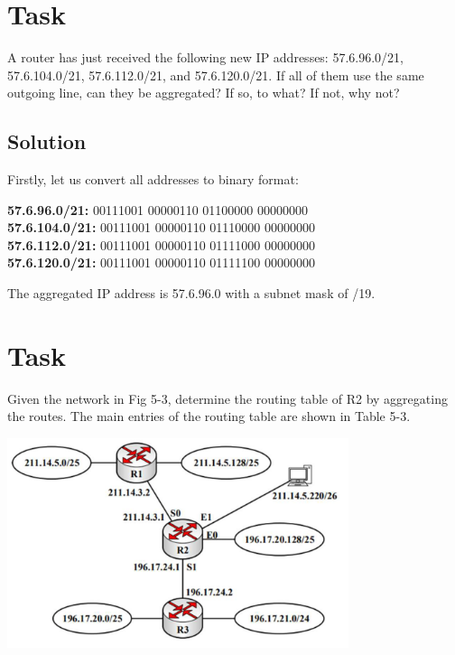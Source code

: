 \documentclass[11pt]{article}
\begin{document}
    \newpage


    \section{Task}
    A router has just received the following new IP addresses: 57.6.96.0/21, 57.6.104.0/21, 57.6.112.0/21,
    and 57.6.120.0/21.
    If all of them use the same outgoing line, can they be aggregated?
    If so, to what?
    If not, why not?

    \subsection{Solution}
    Firstly, let us convert all addresses to binary format:

    \begin{center}
        \textbf{57.6.96.0/21:} 00111001 \hspace{3} 00000110 \hspace{3}01100000 \hspace{3}00000000 \\
        \textbf{57.6.104.0/21:} 00111001 \hspace{3} 00000110 \hspace{3}01110000 \hspace{3}00000000 \\
        \textbf{57.6.112.0/21:} 00111001 \hspace{3} 00000110 \hspace{3}01111000 \hspace{3}00000000 \\
        \textbf{57.6.120.0/21:} 00111001 \hspace{3}00000110 \hspace{3}01111100 \hspace{3}00000000 \\
    \end{center}

    The aggregated IP address is 57.6.96.0 with a subnet mask of /19.
    \newpage


    \section{Task}
    Given the network in Fig 5-3, determine the routing table of R2 by aggregating the routes.
    The main entries of the routing table are shown in Table 5-3.

     \begin{center}
        \includegraphics[width=0.75\textwidth]{figs/task8}
    \end{center}
\end{document}
